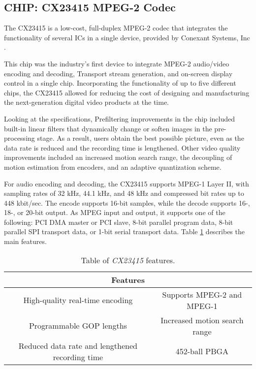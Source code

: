 \subsection{CHIP: CX23415 MPEG-2 Codec}

The CX23415 \cite{cx23415} is a low-cost, full-duplex MPEG-2 codec that integrates the functionality of several ICs in a single device, provided by Conexant Systems, Inc \cite{conexant}.

This chip was the industry's first device to integrate MPEG-2 audio/video encoding and decoding, Transport stream generation, and on-screen display control in a single chip. Incorporating the functionality of up to five different chips, the CX23415 allowed for reducing the cost of designing and manufacturing the next-generation digital video products at the time.

Looking at the specifications, Prefiltering improvements in the chip included built-in linear filters that dynamically change or soften images in the pre-processing stage. As a result, users obtain the best possible picture, even as the data rate is reduced and the recording time is lengthened. Other video quality improvements included an increased motion search range, the decoupling of motion estimation from encoders, and an adaptive quantization scheme. 


For audio encoding and decoding, the CX23415 supports MPEG-1 Layer II, with sampling rates of 32 kHz, 44.1 kHz, and 48 kHz and compressed bit rates up to 448 kbit/sec. The encode supports 16-bit samples, while the decode supports 16-, 18-, or 20-bit output.
As MPEG input and output, it supports one of the following: PCI DMA master or PCI slave, 8-bit parallel program data, 8-bit parallel SPI transport data, or 1-bit serial transport data.
Table \ref{cx} describes the main features.

\begin{table}[h]
    \centering
    \begin{tabular}{|c|c|}
        \hline
        \multicolumn{2}{|c|}{\textbf{Features}} \\
        \hline
         High-quality real-time encoding & Supports MPEG-2 and MPEG-1 \\
         \hline
         Programmable GOP lengths & Increased motion search range \\
         \hline
         Reduced data rate and lengthened recording time & 452-ball PBGA \\
         \hline
    \end{tabular}
    \caption{Table of \textit{CX23415} features.}
    \label{cx}
\end{table}

